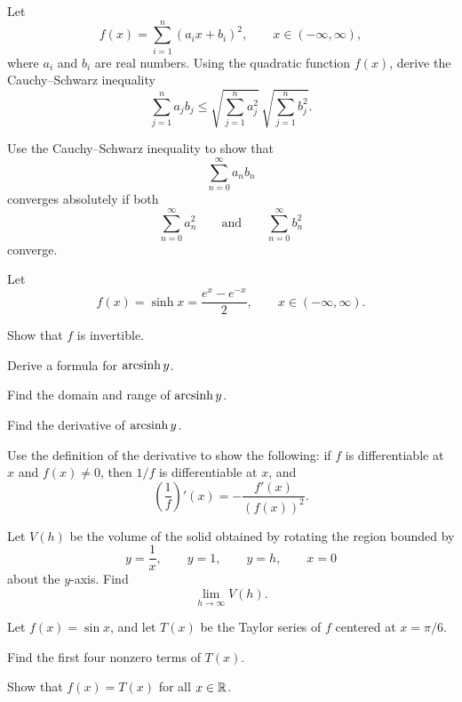 \begin{problem}
\begin{problemsubparts}
\item Let
\[
f(x)=\sum_{i=1}^{n}(a_i x+b_i)^2,
\qquad x\in(-\infty,\infty),
\]
where $a_i$ and $b_i$ are real numbers. Using the quadratic function $f(x)$, derive the Cauchy--Schwarz inequality
\[
\sum_{j=1}^{n}a_jb_j
\le
\sqrt{\sum_{j=1}^{n}a_j^2}\,
\sqrt{\sum_{j=1}^{n}b_j^2}.
\]
\item Use the Cauchy--Schwarz inequality to show that
\[
\sum_{n=0}^{\infty}a_nb_n
\]
converges absolutely if both
\[
\sum_{n=0}^{\infty}a_n^2
\qquad\text{and}\qquad
\sum_{n=0}^{\infty}b_n^2
\]
converge.
\end{problemsubparts}
\end{problem}

\begin{problem}
Let
\[
f(x)=\sinh x=\frac{e^x-e^{-x}}{2},
\qquad x\in(-\infty,\infty).
\]
\begin{problemsubparts}
\item Show that $f$ is invertible.
\item Derive a formula for $\operatorname{arcsinh} y$.
\item Find the domain and range of $\operatorname{arcsinh} y$.
\item Find the derivative of $\operatorname{arcsinh} y$.
\end{problemsubparts}
\end{problem}

\begin{problem}
Use the definition of the derivative to show the following: if $f$ is differentiable at $x$ and $f(x)\ne0$, then $1/f$ is differentiable at $x$, and
\[
\left(\frac1f\right)'(x)
=-\frac{f'(x)}{(f(x))^2}.
\]
\end{problem}

\begin{problem}
Let $V(h)$ be the volume of the solid obtained by rotating the region bounded by
\[
y=\frac{1}{x},
\qquad y=1,
\qquad y=h,
\qquad x=0
\]
about the $y$-axis. Find
\[
\lim_{h\to\infty}V(h).
\]
\end{problem}

\begin{problem}
Let $f(x)=\sin x$, and let $T(x)$ be the Taylor series of $f$ centered at $x=\pi/6$.
\begin{problemsubparts}
\item Find the first four nonzero terms of $T(x)$.
\item Show that $f(x)=T(x)$ for all $x\in\mathbb{R}$.
\end{problemsubparts}
\end{problem}

